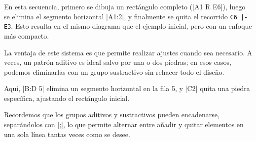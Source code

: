 \begin{goban}[9, stone = {radius = 4pt}, mark = {line = {color = red}}]
\begin{codeexample}[width=6cm]
	\begin{goban}[label = {at = all}, partial = A1:E6]
	\end{goban}
	
	\begin{goban}[label = {at = all}, partial = A1:E6]
	\end{goban}
\end{codeexample}

En esta secuencia, primero se dibuja un rectángulo completo (|A1 R E6|), luego se elimina el segmento horizontal |A1:2|, y finalmente se quita el recorrido \verb+C6 |- E3+. Esto resulta en el mismo diagrama que el ejemplo inicial, pero con un enfoque más compacto.

La ventaja de este sistema es que permite realizar ajustes cuando sea necesario. A veces, un patrón aditivo es ideal salvo por una o dos piedras; en esos casos, podemos eliminarlas con un grupo sustractivo sin rehacer todo el diseño.

\begin{codeexample}[width=6cm]
	\begin{goban}[label = {at = all}]
	\end{goban}
\end{codeexample}

Aquí, |B:D 5| elimina un segmento horizontal en la fila 5, y |C2| quita una piedra específica, ajustando el rectángulo inicial.

Recordemos que los grupos aditivos y sustractivos pueden encadenarse, separándolos con |;|, lo que permite alternar entre añadir y quitar elementos en una sola línea tantas veces como se desee.

\begin{codeexample}[width=6cm]
	\begin{goban}[label = {at = all}, partial = A1:E6]
	\end{goban}
	
	\begin{goban}[label = {at = all}, partial = A1:E6]
	\end{goban}
	
	\begin{goban}[label = {at = all}, partial = A1:E6]
	\end{goban}
\end{codeexample}


\end{goban}
